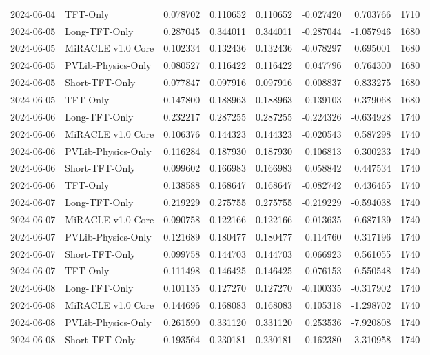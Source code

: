 \begin{tabular}{llrrrrrr}
2024-06-04 & TFT-Only & 0.078702 & 0.110652 & 0.110652 & -0.027420 & 0.703766 & 1710 \\
2024-06-05 & Long-TFT-Only & 0.287045 & 0.344011 & 0.344011 & -0.287044 & -1.057946 & 1680 \\
2024-06-05 & MiRACLE v1.0 Core & 0.102334 & 0.132436 & 0.132436 & -0.078297 & 0.695001 & 1680 \\
2024-06-05 & PVLib-Physics-Only & 0.080527 & 0.116422 & 0.116422 & 0.047796 & 0.764300 & 1680 \\
2024-06-05 & Short-TFT-Only & 0.077847 & 0.097916 & 0.097916 & 0.008837 & 0.833275 & 1680 \\
2024-06-05 & TFT-Only & 0.147800 & 0.188963 & 0.188963 & -0.139103 & 0.379068 & 1680 \\
2024-06-06 & Long-TFT-Only & 0.232217 & 0.287255 & 0.287255 & -0.224326 & -0.634928 & 1740 \\
2024-06-06 & MiRACLE v1.0 Core & 0.106376 & 0.144323 & 0.144323 & -0.020543 & 0.587298 & 1740 \\
2024-06-06 & PVLib-Physics-Only & 0.116284 & 0.187930 & 0.187930 & 0.106813 & 0.300233 & 1740 \\
2024-06-06 & Short-TFT-Only & 0.099602 & 0.166983 & 0.166983 & 0.058842 & 0.447534 & 1740 \\
2024-06-06 & TFT-Only & 0.138588 & 0.168647 & 0.168647 & -0.082742 & 0.436465 & 1740 \\
2024-06-07 & Long-TFT-Only & 0.219229 & 0.275755 & 0.275755 & -0.219229 & -0.594038 & 1740 \\
2024-06-07 & MiRACLE v1.0 Core & 0.090758 & 0.122166 & 0.122166 & -0.013635 & 0.687139 & 1740 \\
2024-06-07 & PVLib-Physics-Only & 0.121689 & 0.180477 & 0.180477 & 0.114760 & 0.317196 & 1740 \\
2024-06-07 & Short-TFT-Only & 0.099758 & 0.144703 & 0.144703 & 0.066923 & 0.561055 & 1740 \\
2024-06-07 & TFT-Only & 0.111498 & 0.146425 & 0.146425 & -0.076153 & 0.550548 & 1740 \\
2024-06-08 & Long-TFT-Only & 0.101135 & 0.127270 & 0.127270 & -0.100335 & -0.317902 & 1740 \\
2024-06-08 & MiRACLE v1.0 Core & 0.144696 & 0.168083 & 0.168083 & 0.105318 & -1.298702 & 1740 \\
2024-06-08 & PVLib-Physics-Only & 0.261590 & 0.331120 & 0.331120 & 0.253536 & -7.920808 & 1740 \\
2024-06-08 & Short-TFT-Only & 0.193564 & 0.230181 & 0.230181 & 0.162380 & -3.310958 & 1740 \\

\end{tabular}
